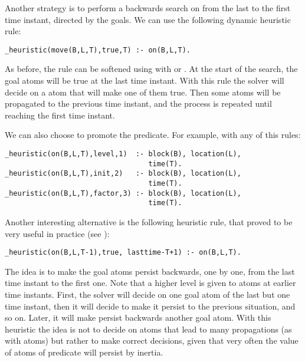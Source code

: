 Another strategy is to perform a backwards search on  from the last to the
first time instant, directed by the goals. 
We can use the following dynamic heuristic rule: 
\begin{lstlisting}[basicstyle=\small\ttfamily,numbers=none]
_heuristic(move(B,L,T),true,T) :- on(B,L,T).
\end{lstlisting}
As before, the rule can be softened using  with  or .
At the start of the search, the goal  atoms will be true at the last time instant.
With this rule the solver will decide on a  atom that will make one of them true.
Then some  atoms will be propagated to the previous time instant,
and the process is repeated until reaching the first time instant.

We can also choose to promote the  predicate.  
For example, with any of this rules:
\begin{lstlisting}[basicstyle=\small\ttfamily,numbers=none]
_heuristic(on(B,L,T),level,1)  :- block(B), location(L), 
                                  time(T).
_heuristic(on(B,L,T),init,2)   :- block(B), location(L), 
                                  time(T).
_heuristic(on(B,L,T),factor,3) :- block(B), location(L), 
                                  time(T).
\end{lstlisting}

Another interesting alternative is the following heuristic rule,  
that proved to be very useful in practice (see \cite{gekaotroscwa13a}):
\begin{lstlisting}[basicstyle=\small\ttfamily,numbers=none]
_heuristic(on(B,L,T-1),true, lasttime-T+1) :- on(B,L,T).
\end{lstlisting}
The idea is to make the goal  atoms persist backwards, 
one by one, from the last time instant to the first one.
Note that a higher level is given to atoms at earlier time instants.
First, the solver will decide on one goal  atom of the last but one time instant,
then it will decide to make it persist to the previous situation, and so on.
Later, it will make persist backwards another goal  atom.
With this heuristic the idea is not to decide on atoms that lead to many propagations (as with  atoms)
but rather to make correct decisions, 
given that very often the value of atoms of predicate  will persist by inertia.


